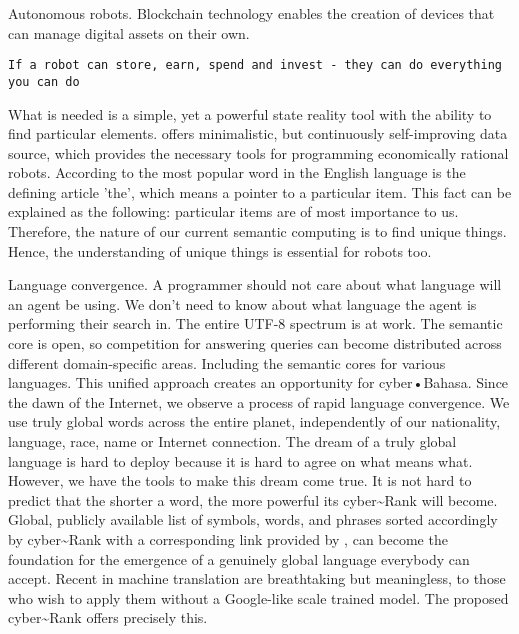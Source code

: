 \documentclass[8pt,oneside]{amsart}
\newcommand{\linkred}[2]{\href{#1}{\color{red}{#2}}}
\newcommand{\linkgreen}[2]{\href{#1}{\color{green}{#2}}}
\begin{document}
Autonomous robots. Blockchain technology enables the creation of devices that can manage digital assets on their own.

\begin{lstlisting}
If a robot can store, earn, spend and invest - they can do everything you can do
\end{lstlisting}

What is needed is a simple, yet a powerful state reality tool with the ability to find particular elements. \linkred{https://github.com/cybercongress/go-cyber}{go-cyber} offers minimalistic, but continuously self-improving data source, which provides the necessary tools for programming economically rational robots. According to \linkgreen{https://github.com/first20hours/google-10000-english}{top-10,000 English words} the most popular word in the English language is the defining article 'the', which means a pointer to a particular item. This fact can be explained as the following: particular items are of most importance to us. Therefore, the nature of our current semantic computing is to find unique things. Hence, the understanding of unique things is essential for robots too.

Language convergence. A programmer should not care about what language will an agent be using. We don't need to know about what language the agent is performing their search in. The entire UTF-8 spectrum is at work. The semantic core is open, so competition for answering queries can become distributed across different domain-specific areas. Including the semantic cores for various languages. This unified approach creates an opportunity for cyber•Bahasa. Since the dawn of the Internet, we observe a process of rapid language convergence. We use truly global words across the entire planet, independently of our nationality, language, race, name or Internet connection. The dream of a truly global language is hard to deploy because it is hard to agree on what means what. However, we have the tools to make this dream come true. It is not hard to predict that the shorter a word, the more powerful its cyber\~{}Rank will become. Global, publicly available list of symbols, words, and phrases sorted accordingly by cyber\~{}Rank with a corresponding link provided by \linkred{https://github.com/cybercongress/go-cyber}{go-cyber}, can become the foundation for the emergence of a genuinely global language everybody can accept. Recent \linkgreen{https://ipfs.io/ipfs/QmQUWBhDMfPKgFt3NfbxM1VU22oU8CRepUzGPBDtopwap1}{scientific advances} in machine translation are breathtaking but meaningless, to those who wish to apply them without a Google-like scale trained model. The proposed cyber\~{}Rank offers precisely this.
\end{document}
